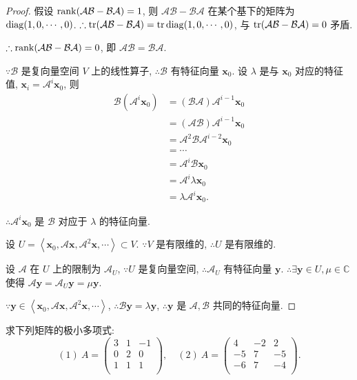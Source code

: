 \documentclass[color=black,device=normal,lang=cn,mode=geye]{elegantnote}
\begin{document}
\begin{proof}
    假设 $\operatorname{rank}(\mathcal{AB}-\mathcal{BA})=1$, 则 $\mathcal{AB}-\mathcal{BA}$ 在某个基下的矩阵为 $\operatorname{diag}(1,0,\cdots,0)$. $\therefore\operatorname{tr}(\mathcal{AB}-\mathcal{BA})=\operatorname{tr}\operatorname{diag}(1,0,\cdots,0)$, 与 $\operatorname{tr}(\mathcal{AB}-\mathcal{BA})=0$ 矛盾.
    
    $\therefore\operatorname{rank}(\mathcal{AB}-\mathcal{BA})=0$, 即 $\mathcal{AB}=\mathcal{BA}$.
    
    $\because\mathcal{B}$ 是复向量空间 $V$ 上的线性算子, $\therefore\mathcal{B}$ 有特征向量 $\boldsymbol{x}_0$. 设 $\lambda$ 是与 $\boldsymbol{x}_0$ 对应的特征值, $\boldsymbol{x}_i=\mathcal{A}^i\boldsymbol{x}_0$, 则
    \begin{align*}
        \mathcal{B}(\mathcal{A}^i\boldsymbol{x}_0) & =(\mathcal{B}\mathcal{A})\mathcal{A}^{i-1}\boldsymbol{x}_0 \\
        & =(\mathcal{A}\mathcal{B})\mathcal{A}^{i-1}\boldsymbol{x}_0 \\
        & =\mathcal{A}^2\mathcal{B}\mathcal{A}^{i-2}\boldsymbol{x}_0 \\
        & =\cdots \\
        & =\mathcal{A}^i\mathcal{B}\boldsymbol{x}_0 \\
        & =\mathcal{A}^i\lambda\boldsymbol{x}_0 \\
        & =\lambda\mathcal{A}^i\boldsymbol{x}_0.
    \end{align*}

    $\therefore\mathcal{A}^i\boldsymbol{x}_0$ 是 $\mathcal{B}$ 对应于 $\lambda$ 的特征向量.

    设 $U=\left<\boldsymbol{x}_0,\mathcal{A}\boldsymbol{x},\mathcal{A}^2\boldsymbol{x},\cdots\right>\subset V$. $\because V$ 是有限维的, $\therefore U$ 是有限维的.
    
    设 $\mathcal{A}$ 在 $U$ 上的限制为 $\mathcal{A}_U$, $\because U$ 是复向量空间, $\therefore\mathcal{A}_U$ 有特征向量 $\boldsymbol{y}$. $\therefore\exists\boldsymbol{y}\in U,\mu\in\mathbb{C}$ 使得 $\mathcal{A}\boldsymbol{y}=\mathcal{A}_U\boldsymbol{y}=\mu\boldsymbol{y}$.

    $\because\boldsymbol{y}\in\left<\boldsymbol{x}_0,\mathcal{A}\boldsymbol{x},\mathcal{A}^2\boldsymbol{x},\cdots\right>$, $\therefore\mathcal{B}\boldsymbol{y}=\lambda\boldsymbol{y}$, $\therefore\boldsymbol{y}$ 是 $\mathcal{A},\mathcal{B}$ 共同的特征向量.
\end{proof}
\begin{exercisec}[2.4.1]
    求下列矩阵的极小多项式:
    \[(1)\ A=\begin{pmatrix}
        3 & 1 & -1 \\
        0 & 2 & 0 \\
        1 & 1 & 1 \\
    \end{pmatrix},\quad(2)\ A=\begin{pmatrix}
        4 & -2 & 2 \\
        -5 & 7 & -5 \\
        -6 & 7 & -4 \\
    \end{pmatrix}.\]
\end{exercisec}
\end{document}
